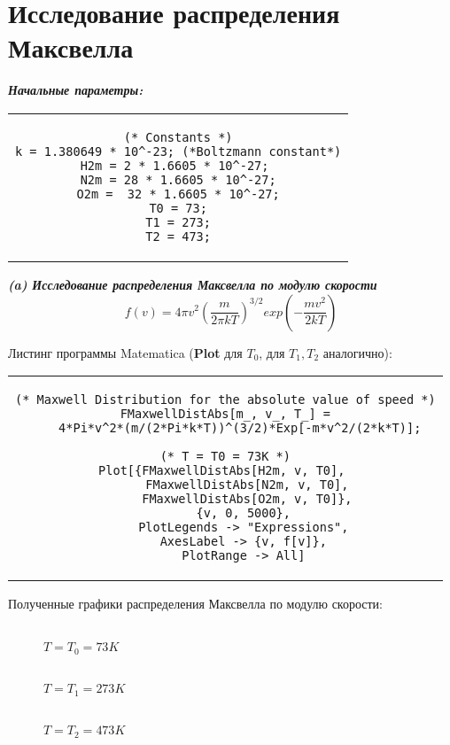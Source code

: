 \section[Исследование распределения Максвелла]{Исследование распределения Максвелла}

\textit{\textbf{Начальные параметры:}}
\begin{center}
    \begin{tabular}{c}
    \begin{lstlisting}
(* Constants *)
k = 1.380649 * 10^-23; (*Boltzmann constant*)
H2m = 2 * 1.6605 * 10^-27; 
N2m = 28 * 1.6605 * 10^-27;
O2m =  32 * 1.6605 * 10^-27;
T0 = 73;
T1 = 273;
T2 = 473;
    \end{lstlisting}
    \end{tabular}
\end{center}


\textit{\textbf{(a) Исследование распределения Максвелла по модулю скорости}}  
\begin{equation*}
    f(v) = 4\pi v^{2} (\frac{m}{2\pi kT})^{3/2} exp(-\frac{mv^{2}}{2kT})
\end{equation*}


Листинг программы Matematica (\textbf{Plot} для $T_{0}$, для $T_{1}, T_{2}$ аналогично):
\begin{center}
    \begin{tabular}{c}
    \begin{lstlisting}
(* Maxwell Distribution for the absolute value of speed *)
FMaxwellDistAbs[m_, v_, T_] =
    4*Pi*v^2*(m/(2*Pi*k*T))^(3/2)*Exp[-m*v^2/(2*k*T)];

(* T = T0 = 73K *)
Plot[{FMaxwellDistAbs[H2m, v, T0], 
      FMaxwellDistAbs[N2m, v, T0],
      FMaxwellDistAbs[O2m, v, T0]},
     {v, 0, 5000},
     PlotLegends -> "Expressions",
     AxesLabel -> {v, f[v]},
     PlotRange -> All]
    \end{lstlisting}
    \end{tabular}
\end{center}

\newpage
Полученные графики распределения Максвелла по модулю скорости:
\hspace{0pt}
\begin{figure}[H]
    \begin{minipage}[h]{0.47\linewidth}
        \\
        $T=T_{0}=73K$
    \end{minipage}
    \hfill
    \begin{minipage}[h]{0.47\linewidth}
        \\
        $T=T_{1}=273K$
    \end{minipage}
    \vfill
    \vspace{6pt}
    \centering 
    \begin{minipage}[h]{0.47\linewidth}
        \\
        $T=T_{2}=473K$
    \end{minipage}
\end{figure}


